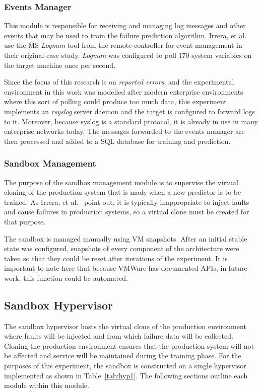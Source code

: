 \subsubsection{Events Manager} \label{sec:eventsManagerMgr}
This module is responsible for receiving and managing log messages and other
events that may be used to train the failure prediction algorithm.  Irrera, et
al.~\cite{irrera2015} use the \ac{MS} \emph{Logman} tool from the remote
controller for event management in their original case study.  \emph{Logman}
was configured to poll $170$ system variables on the target machine once per
second.  

Since the focus of this research is on \emph{reported errors}, and the
experimental environment in this work was modelled after modern enterprise
environments where this sort of polling could produce too much data, this
experiment implements an \emph{rsyslog} server daemon and the target is
configured to forward logs to it.  Moreover, because syslog is a standard
protocol, it is already in use in many enterprise networks today.  The messages
forwarded to the events manager are then processed and added to a \ac{SQL}
database for training and prediction.  

\subsubsection{Sandbox Management} \label{sec:sandboxMgr} 
The purpose of the sandbox management module is to supervise the virtual
cloning of the production system that is made when a new predictor is to be
trained.  As Irrera, et al.~\cite{irrera2015,irrera2013} point out, it is
typically inappropriate to inject faults and cause failures in production
systems, so a virtual clone must be created for that purpose.

The sandbox is managed manually using \ac{VM} snapshots.  After an initial
stable state was configured, snapshots of every component of the architecture
were taken so that they could be reset after iterations of the experiment.  It
is important to note here that because VMWare has documented \ac{API}s, in
future work, this function could be automated.

\subsection{Sandbox Hypervisor} \label{sec:sandbox}
The sandbox hypervisor hosts the virtual clone of the production environment
where faults will be injected and from which failure data will be collected.
Cloning the production environment ensures that the production system will not
be affected and service will be maintained during the training phase.  For the
purposes of this experiment, the sandbox is constructed on a single hypervisor
implemented as shown in Table~\ref{tab:hyp1}.  The following sections outline
each module within this module.

